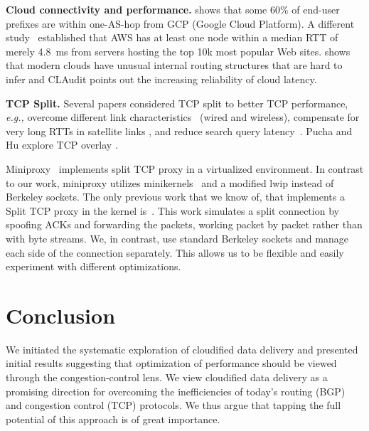 \documentclass[newfonts=false,format=sigconf,10pt,letterpaper]{acmart}
\providecommand{\eg}{\emph{e.g.,} }
\newcommand{\T}[1]{\smallskip\noindent\textbf{#1}} %
\newcommand{\sockets}{Berkeley sockets\xspace}
\begin{document}
\T{Cloud connectivity and performance.} \cite{one-hop} shows that some 60\% of end-user prefixes are within one-AS-hop from GCP (Google Cloud Platform). A different study~\cite{cgn2017} established that AWS has at least one node within a median RTT of merely 4.8~ms from servers hosting the top 10k most popular Web sites. \cite{unusual} shows that modern clouds have unusual internal routing structures that are hard to infer and CLAudit \cite{multidimensional} points out the increasing reliability of cloud latency. 

\T{TCP Split.} Several papers considered TCP split to better TCP performance, \eg overcome different link characteristics~ \cite{Kopparty2002} (wired and wireless), compensate for very long RTTs in satellite links \cite{luglio2004}, and reduce search query latency~\cite{pathak2010measuring}. 
Pucha and Hu explore TCP overlay \cite{pucha2005overlay, pucha2005slot}. 

Miniproxy~\cite{siracusano2016miniproxy} implements split TCP proxy in a virtualized environment. In contrast to our work, miniproxy utilizes minikernels~\cite{minikernel} and a modified lwip \cite{lwip} instead of \sockets. The only previous work that we know of, that implements a Split TCP proxy in the kernel is~\cite{kernelsplit}. This work simulates a split connection by spoofing ACKs and forwarding the packets, working packet by packet rather than with byte streams. We, in contrast, use standard \sockets and manage each side of the connection separately. This allows us to be flexible and easily experiment with different optimizations.

\section{Conclusion}\label{sec:conclusion}
We initiated the systematic exploration of cloudified data delivery and presented initial results suggesting that optimization of performance should be viewed through the congestion-control lens.  We view cloudified data delivery as a promising direction for overcoming the inefficiencies of today's routing (BGP) and congestion control (TCP) protocols. We thus argue that tapping the full potential of this approach is of great importance. 




\end{document}
